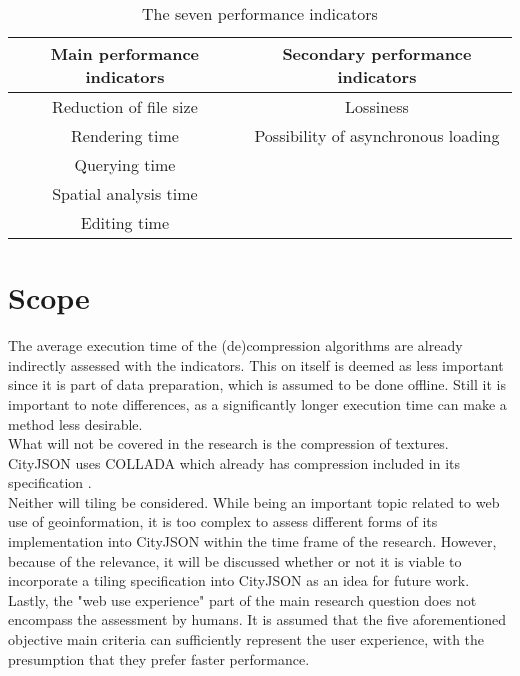 \begin{table}[h!]
\begin{center}
 \begin{tabular}{ |c || c|} 
 \hline
  Main performance indicators & Secondary performance indicators \\ [0.5ex] 
 \hline\hline
 Reduction of file size & Lossiness \\ 
 \hline
 Rendering time & Possibility of asynchronous loading \\
 \hline
 Querying time & \\
 \hline
 Spatial analysis time & \\
 \hline
 Editing time & \\
 \hline
\end{tabular}
\caption{The seven performance indicators}
\label{tab:indicators}
\end{center}
\end{table}


\section{Scope} \label{scope}
The average execution time of the (de)compression algorithms are already indirectly assessed with the indicators.
This on itself is deemed as less important since it is part of data preparation, which is assumed to be done offline.
Still it is important to note differences, as a significantly longer execution time can make a method less desirable.\\

What will not be covered in the research is the compression of textures.
CityJSON uses COLLADA which already has compression included in its specification \citep{collada}.\\

Neither will tiling be considered.
While being an important topic related to web use of geoinformation, it is too complex to assess different forms of its implementation into CityJSON within the time frame of the research.
However, because of the relevance, it will be discussed whether or not it is viable to incorporate a tiling specification into CityJSON as an idea for future work.\\

Lastly, the "web use experience" part of the main research question does not encompass the assessment by humans.
It is assumed that the five aforementioned objective main criteria can sufficiently represent the user experience, with the presumption that they prefer faster performance.